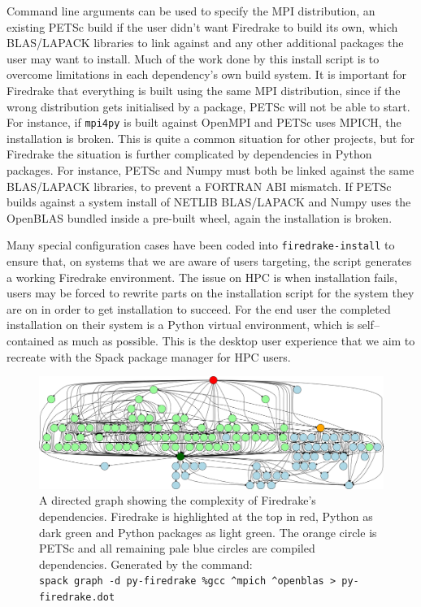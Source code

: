 \documentclass[a4paper,11pt]{article}
\begin{document}
Command line arguments can be used to specify the MPI distribution, an existing PETSc build if the user didn't want Firedrake to build its own, which BLAS/LAPACK libraries to link against and any other additional packages the user may want to install.
Much of the work done by this install script is to overcome limitations in each dependency's own build system.
It is important for Firedrake that everything is built using the same MPI distribution, since if the wrong distribution gets initialised by a package, PETSc will not be able to start.
For instance, if \verb`mpi4py` is built against OpenMPI and PETSc uses MPICH, the installation is broken.
This is quite a common situation for other projects, but for Firedrake the situation is further complicated by dependencies in Python packages.
For instance, PETSc and Numpy must both be linked against the same BLAS/LAPACK libraries, to prevent a FORTRAN ABI mismatch.
If PETSc builds against a system install of NETLIB BLAS/LAPACK and Numpy uses the OpenBLAS bundled inside a pre-built wheel, again the installation is broken.

Many special configuration cases have been coded into \verb`firedrake-install` to ensure that, on systems that we are aware of users targeting, the script generates a working Firedrake environment.
The issue on HPC is when installation fails, users may be forced to rewrite parts on the installation script for the system they are on in order to get installation to succeed.
For the end user the completed installation on their system is a Python virtual environment, which is self--contained as much as possible.
This is the desktop user experience that we aim to recreate with the Spack package manager for HPC users.

\begin{figure}[htp]
	\centering
	\includegraphics[width=\textwidth]{firedrake_deps.png}
	\caption{A directed graph showing the complexity of Firedrake's dependencies. Firedrake is highlighted at the top in red, Python as dark green and Python packages as light green. The orange circle is PETSc and all remaining pale blue circles are compiled dependencies. Generated by the command:\\ \texttt{spack graph -d py-firedrake \%gcc \^{}mpich \^{}openblas \textgreater{} py-firedrake.dot}}
	\label{fig:fddeps}
\end{figure}
\end{document}
